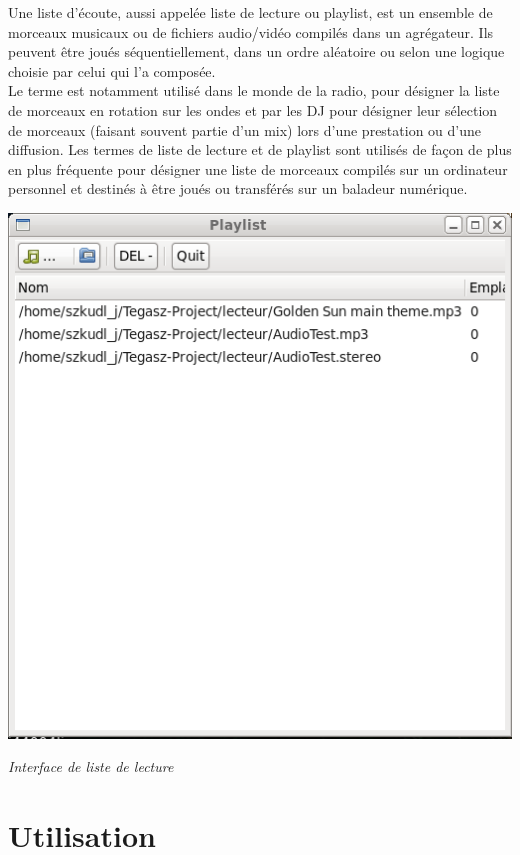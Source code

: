 \documentclass[12pt,a4paper]{report}
\begin{document}
Une liste d'écoute, aussi appelée liste de lecture ou playlist, est un ensemble de morceaux musicaux ou de fichiers audio/vidéo compilés dans un agrégateur. Ils peuvent être joués séquentiellement, dans un ordre aléatoire ou selon une logique choisie par celui qui l'a composée.\\

Le terme est notamment utilisé dans le monde de la radio, pour désigner la liste de morceaux en rotation sur les ondes et par les DJ pour désigner leur sélection de morceaux (faisant souvent partie d'un mix) lors d'une prestation ou d'une diffusion.
Les termes de liste de lecture et de playlist sont utilisés de façon de plus en plus fréquente pour désigner une liste de morceaux compilés sur un ordinateur personnel et destinés à être joués ou transférés sur un baladeur numérique.


\begin{center}
\includegraphics[scale=0.5]{playlist.png}

\it{Interface de liste de lecture}

\end{center}

\section{Utilisation}
\end{document}
